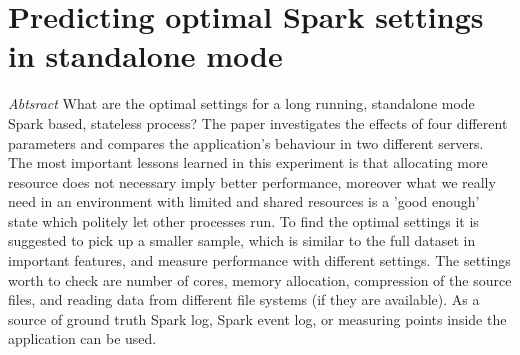 \chapter{Predicting optimal Spark settings in standalone mode}

\emph{Abtsract} What are the optimal settings for a long running, standalone mode Spark based, stateless process? The paper investigates the effects of four different parameters and compares the application's behaviour in two different servers. The most important lessons learned in this experiment is that allocating more resource does not necessary imply better performance, moreover what we really need in an environment with limited and shared resources is a 'good enough' state which politely let other processes run. To find the optimal settings it is suggested to pick up a smaller sample, which is similar to the full dataset in important features, and measure performance with different settings. The settings worth to check are number of cores, memory allocation, compression of the source files, and reading data from different file systems (if they are available). As a source of ground truth Spark log, Spark event log, or measuring points inside the application can be used.

%
%
%
